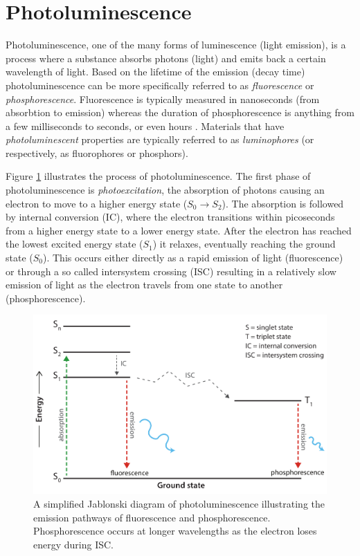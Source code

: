 \documentclass[thesis.tex]{subfiles}
\begin{document}
\section{Photoluminescence}
\label{section:photoluminescence}
\enlargethispage{2\baselineskip}
Photoluminescence, one of the many forms of luminescence (light emission), is a process where a substance absorbs photons (light) and emits back a certain wavelength of light. Based on the lifetime of the emission (decay time) photoluminescence can be more specifically referred to as \emph{fluorescence} or \emph{phosphorescence}. Fluorescence is typically measured in nanoseconds (from absorbtion to emission) whereas the duration of phosphorescence is anything from a few milliseconds to seconds, or even hours \cite{luminescence_basics}. Materials that have \emph{photoluminescent} properties are typically referred to as \emph{luminophores} (or respectively, as fluorophores or phosphors).

Figure \ref{figure:photoluminescence} illustrates the process of photoluminescence. The first phase of photoluminescence is \emph{photoexcitation}, the absorption of photons causing an electron to move to a higher energy state ($S_0 \rightarrow S_2$). The absorption is followed by internal conversion (IC), where the electron transitions within picoseconds from a higher energy state to a lower energy state. After the electron has reached the lowest excited energy state ($S_1$) it relaxes, eventually reaching the ground state ($S_0$). This occurs either directly as a rapid emission of light (fluorescence) or through a so called intersystem crossing (ISC) resulting in a relatively slow emission of light as the electron travels from one state to another (phosphorescence).


\begin{figure}[h!]
\vspace{-4mm}
\centering \includegraphics[width=\textwidth]{images/photoluminescence.pdf}
\vspace{-8mm}
\caption{A simplified Jablonski diagram of photoluminescence illustrating the emission pathways of fluorescence and phosphorescence. Phosphorescence occurs at longer wavelengths as the electron loses energy during ISC. \label{figure:photoluminescence}}
\end{figure}
\end{document}
